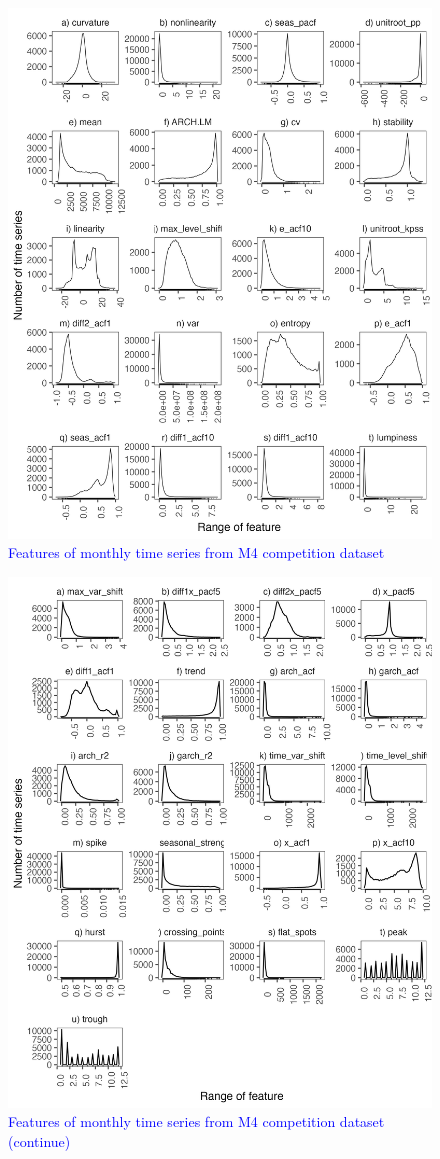 \documentclass[preprint, 3p,
authoryear]{elsarticle} %
\begin{document}
\begin{figure}[H]

{\centering \includegraphics[width=0.7\linewidth]{img/featurets_selection1} 

}

\caption{ \textcolor{blue}{Features of monthly time series from M4 competition dataset} }\label{fig:feature1}
\end{figure}

\begin{figure}[H]

{\centering \includegraphics[width=0.7\linewidth]{img/featurets_selection2} 

}

\caption{ \textcolor{blue}{Features of monthly time series from M4 competition dataset (continue)} }\label{fig:feature2}
\end{figure}
\end{document}
